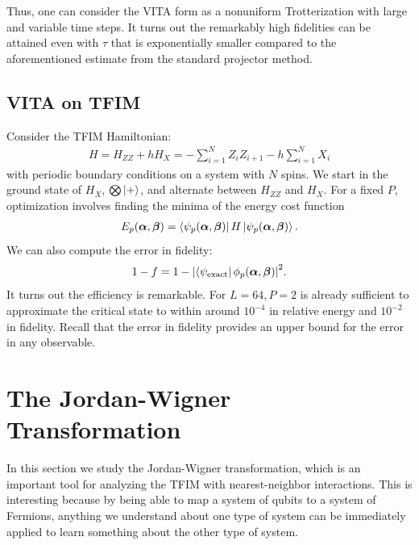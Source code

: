 \documentclass{book}
\theoremstyle{definition}
\newcommand{\al}{\alpha}
\newcommand{\be}{\beta}
\begin{document}
Thus, one can consider the VITA form as a nonuniform Trotterization with large and variable time steps. It turns out the remarkably high fidelities can be attained even with $\tau$ that is exponentially smaller compared to the aforementioned estimate from the standard projector method. 


\subsection{VITA on TFIM}


Consider the TFIM Hamiltonian:
\begin{align}
H = H_{ZZ} + h H_X = -\sum^N_{i=1}Z_i Z_{i+1} - h \sum^N_{i=1}X_i
\end{align}
with periodic boundary conditions on a system with $N$ spins. We start in the ground state of $H_X$, $\bigotimes \ket{+}$, and alternate between $H_{ZZ}$ and $H_X$. For a fixed $P$, optimization involves finding the minima of the energy cost function 
\begin{align}
E_p(\bm \al, \bm \be) = \bra{\psi_p(\bm \al,\bm\be)}H \ket{\psi_p (\bm\al,\bm\be)}.
\end{align}
We can also compute the error in fidelity:
\begin{align}
1-f = 1- \abs{\bra{\psi_{\text{exact}}}{\phi_p(\bm\al,\bm\be)}}^2.
\end{align}
It turns out the efficiency is remarkable. For $L=64, P=2$ is already sufficient to approximate the critical state to within around $10^{-4}$ in relative energy and $10^{-2}$ in fidelity.  Recall that the error in fidelity provides an upper bound for the error in any observable.







\newpage


\section{The Jordan-Wigner Transformation}


In this section we study the Jordan-Wigner transformation, which is an important tool for analyzing the TFIM with nearest-neighbor interactions. This is interesting because by being able to map a system of qubits to a system of Fermions, anything we understand about one type of system can be immediately applied to learn something about the other type of system. \\
\end{document}
